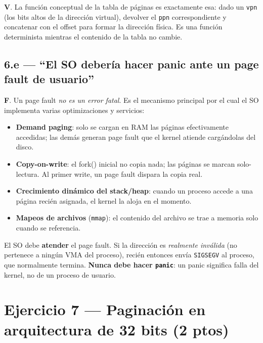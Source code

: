 \documentclass[11pt,a4paper]{article}
\begin{document}
\begin{respuesta}
\textbf{V}. La función conceptual de la tabla de páginas es
exactamente esa: dado un \texttt{vpn} (los bits altos de la
dirección virtual), devolver el \texttt{ppn} correspondiente y
concatenar con el offset para formar la dirección física. Es una
función determinista mientras el contenido de la tabla no cambie.
\end{respuesta}

\subsection*{6.e --- ``El SO debería hacer panic ante un page fault de usuario''}

\begin{respuesta}
\textbf{F}. Un page fault \emph{no es un error fatal}. Es el
mecanismo principal por el cual el SO implementa varias optimizaciones
y servicios:

\begin{itemize}[leftmargin=*,nosep]
    \item \textbf{Demand paging}: solo se cargan en RAM las páginas
        efectivamente accedidas; las demás generan page fault que
        el kernel atiende cargándolas del disco.
    \item \textbf{Copy-on-write}: el fork() inicial no copia
        nada; las páginas se marcan solo-lectura. Al primer write,
        un page fault dispara la copia real.
    \item \textbf{Crecimiento dinámico del stack/heap}: cuando un
        proceso accede a una página recién asignada, el kernel la
        aloja en el momento.
    \item \textbf{Mapeos de archivos} (\texttt{mmap}): el contenido
        del archivo se trae a memoria solo cuando se referencia.
\end{itemize}

El SO debe \textbf{atender} el page fault. Si la dirección es
\emph{realmente inválida} (no pertenece a ningún VMA del proceso),
recién entonces envía \texttt{SIGSEGV} al proceso, que normalmente
termina. \textbf{Nunca debe hacer \texttt{panic}}: un panic significa
falla del kernel, no de un proceso de usuario.
\end{respuesta}

\section{Ejercicio 7 --- Paginación en arquitectura de 32 bits (2 ptos)}
\end{document}
